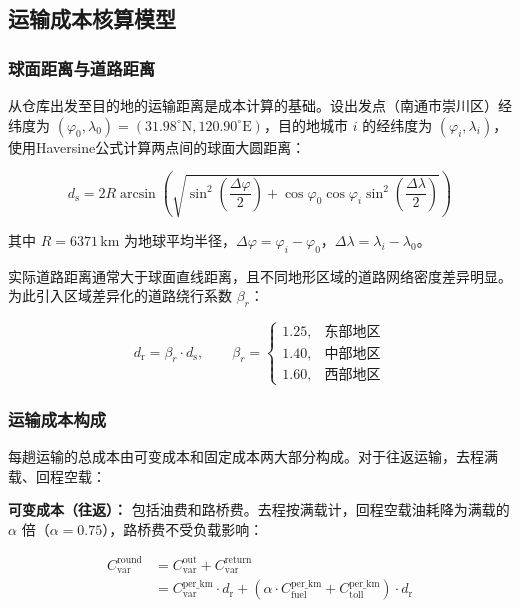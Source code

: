 \subsection{运输成本核算模型}

\subsubsection{球面距离与道路距离}

从仓库出发至目的地的运输距离是成本计算的基础。设出发点（南通市崇川区）经纬度为 $(\varphi_0, \lambda_0) = (31.98^\circ\mathrm{N}, 120.90^\circ\mathrm{E})$，目的地城市 $i$ 的经纬度为 $(\varphi_i, \lambda_i)$，使用Haversine公式\cite{sinnott1984haversine}计算两点间的球面大圆距离：

\begin{equation}\label{eq:haversine}
d_{\mathrm{s}} = 2R \arcsin\!\left(\sqrt{\sin^2\!\left(\frac{\Delta\varphi}{2}\right) + \cos\varphi_0 \cos\varphi_i \sin^2\!\left(\frac{\Delta\lambda}{2}\right)}\right)
\end{equation}

其中 $R = 6371\,\mathrm{km}$ 为地球平均半径，$\Delta\varphi = \varphi_i - \varphi_0$，$\Delta\lambda = \lambda_i - \lambda_0$。

实际道路距离通常大于球面直线距离，且不同地形区域的道路网络密度差异明显。为此引入区域差异化的道路绕行系数 $\beta_r$\cite{ballou2002circuity}：

\begin{equation}\label{eq:road}
d_{\mathrm{r}} = \beta_r \cdot d_{\mathrm{s}},\qquad \beta_r = \begin{cases}
1.25, & \text{东部地区}\\
1.40, & \text{中部地区}\\
1.60, & \text{西部地区}
\end{cases}
\end{equation}

\subsubsection{运输成本构成}

每趟运输的总成本由可变成本和固定成本两大部分构成。对于往返运输，去程满载、回程空载：

\textbf{可变成本（往返）：} 包括油费和路桥费。去程按满载计，回程空载油耗降为满载的 $\alpha$ 倍（$\alpha = 0.75$）\cite{coyle2006transportation}，路桥费不受负载影响：

\begin{equation}\label{eq:var}
\begin{aligned}
C_{\mathrm{var}}^{\mathrm{round}} &= C_{\mathrm{var}}^{\mathrm{out}} + C_{\mathrm{var}}^{\mathrm{return}}\\
&= C_{\mathrm{var}}^{\mathrm{per\_km}} \cdot d_{\mathrm{r}} + \left(\alpha \cdot C_{\mathrm{fuel}}^{\mathrm{per\_km}} + C_{\mathrm{toll}}^{\mathrm{per\_km}}\right) \cdot d_{\mathrm{r}}
\end{aligned}
\end{equation}

